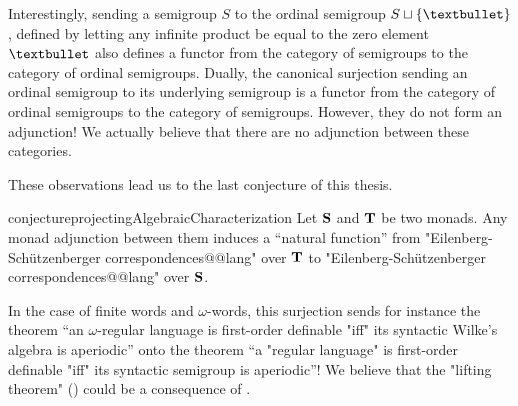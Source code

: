 Interestingly, sending a semigroup $S$ to the ordinal semigroup
$S \dcup \{\textbullet\}$, defined by letting any infinite product
be equal to the zero element $\textbullet$ also defines a functor
from the category of semigroups to the category of ordinal semigroups.
Dually, the canonical surjection sending an ordinal semigroup to
its underlying semigroup is a functor from
the category of ordinal semigroups to the category of semigroups.
However, they do not form an adjunction!
We actually believe that there are no adjunction between these categories.

These observations lead us to the last conjecture of this thesis.
\begin{restatable}{conjecture}{projectingAlgebraicCharacterization}
	\AP\label{conj:projecting-algebraic-characterizations}
	Let $\Monad[S]$ and $\Monad[T]$ be two monads.
	Any monad adjunction between them induces
	a ``natural function'' from "Eilenberg-Schützenberger correspondences@@lang" over $\Monad[T]$
	to "Eilenberg-Schützenberger correspondences@@lang" over $\Monad[S]$.
\end{restatable}

In the case of finite words and $\omega$-words, this
surjection sends for instance the theorem
``an $\omega$-regular language is first-order definable "iff" its
syntactic Wilke's algebra is aperiodic'' onto the theorem
``a "regular language" is first-order definable "iff" its
syntactic semigroup is aperiodic''!
We believe that the "lifting theorem" ()
could be a consequence of
.
